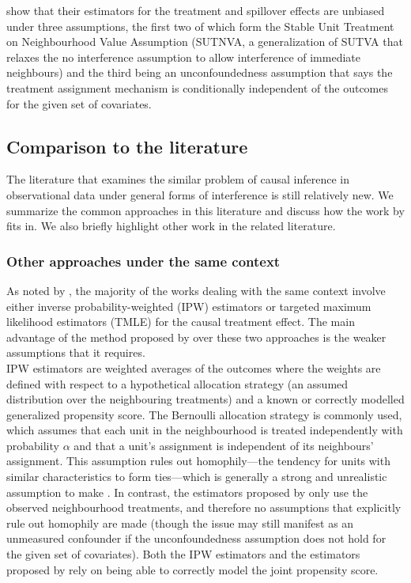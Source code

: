 \documentclass[10pt]{article}
\begin{document}
\textcite{Forastiere:2021} show that their estimators for the treatment and spillover effects are unbiased under three assumptions, the first two of which form the Stable Unit Treatment on Neighbourhood Value Assumption (SUTNVA, a generalization of SUTVA that relaxes the no interference assumption to allow interference of immediate neighbours) and the third being an unconfoundedness assumption that says the treatment assignment mechanism is conditionally independent of the outcomes for the given set of covariates.

\subsection{Comparison to the literature}

The literature that examines the similar problem of causal inference in observational data under general forms of interference is still relatively new. We summarize the common approaches in this literature and discuss how the work by \textcite{Forastiere:2021} fits in. We also briefly highlight other work in the related literature.

\subsubsection{Other approaches under the same context}

As noted by \citeauthor{Forastiere:2021}, the majority of the works dealing with the same context involve either inverse probability-weighted (IPW) estimators \parencite{Liu:2016} or targeted maximum likelihood estimators (TMLE) \parencite{VanDerLaan:2014,Sofrygin:2017,Ogburn:2017} for the causal treatment effect. The main advantage of the method proposed by \textcite{Forastiere:2021} over these two approaches is the weaker assumptions that it requires.
\\

IPW estimators are weighted averages of the outcomes where the weights are defined with respect to a hypothetical allocation strategy (an assumed distribution over the neighbouring treatments) and a known or correctly modelled generalized propensity score. The Bernoulli allocation strategy \parencite{Tchetgen:2012} is commonly used, which assumes that each unit in the neighbourhood is treated independently with probability $\alpha$ and that a unit's assignment is independent of its neighbours' assignment. This assumption rules out homophily---the tendency for units with similar characteristics to form ties---which is generally a strong and unrealistic assumption to make \parencite{Shalizi:2011}. In contrast, the estimators proposed by \textcite{Forastiere:2021} only use the observed neighbourhood treatments, and therefore no assumptions that explicitly rule out homophily are made (though the issue may still manifest as an unmeasured confounder if the unconfoundedness assumption does not hold for the given set of covariates). Both the IPW estimators and the estimators proposed by \textcite{Forastiere:2021} rely on being able to correctly model the joint propensity score.
\\
\end{document}
